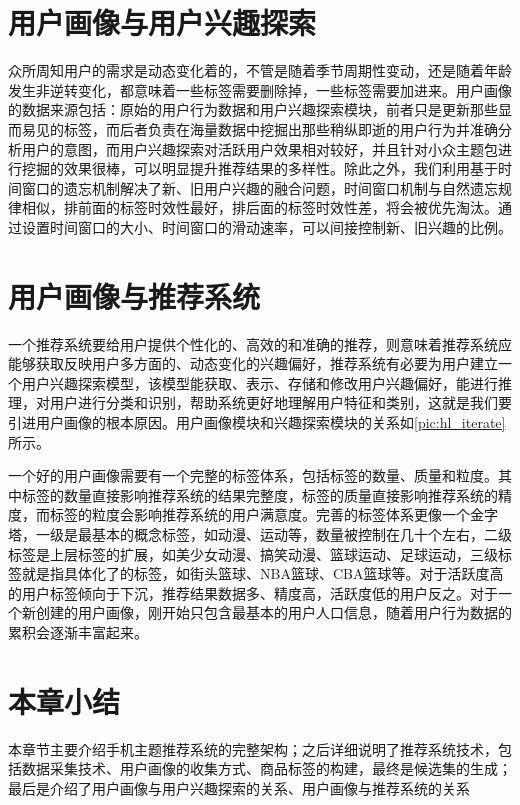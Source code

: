   \section{用户画像与用户兴趣探索}
  众所周知用户的需求是动态变化着的，不管是随着季节周期性变动，还是随着年龄发生非逆转变化，都意味着一些标签需要删除掉，一些标签需要加进来。用户画像的数据来源包括：原始的用户行为数据和用户兴趣探索模块，前者只是更新那些显而易见的标签，而后者负责在海量数据中挖掘出那些稍纵即逝的用户行为并准确分析用户的意图，而用户兴趣探索对活跃用户效果相对较好，并且针对小众主题包进行挖掘的效果很棒，可以明显提升推荐结果的多样性。除此之外，我们利用基于时间窗口的遗忘机制解决了新、旧用户兴趣的融合问题，时间窗口机制与自然遗忘规律相似，排前面的标签时效性最好，排后面的标签时效性差，将会被优先淘汰。通过设置时间窗口的大小、时间窗口的滑动速率，可以间接控制新、旧兴趣的比例。

  \section{用户画像与推荐系统}
  一个推荐系统要给用户提供个性化的、高效的和准确的推荐，则意味着推荐系统应能够获取反映用户多方面的、动态变化的兴趣偏好，推荐系统有必要为用户建立一个用户兴趣探索模型，该模型能获取、表示、存储和修改用户兴趣偏好，能进行推理，对用户进行分类和识别，帮助系统更好地理解用户特征和类别，这就是我们要引进用户画像的根本原因。用户画像模块和兴趣探索模块的关系如\autoref{pic:hl_iterate}所示。
  \begin{figure}
    \centering
      \label{pic:hl_iterate}
  \end{figure}

  一个好的用户画像需要有一个完整的标签体系，包括标签的数量、质量和粒度。其中标签的数量直接影响推荐系统的结果完整度，标签的质量直接影响推荐系统的精度，而标签的粒度会影响推荐系统的用户满意度。完善的标签体系更像一个金字塔，一级是最基本的概念标签，如动漫、运动等，数量被控制在几十个左右，二级标签是上层标签的扩展，如美少女动漫、搞笑动漫、篮球运动、足球运动，三级标签就是指具体化了的标签，如街头篮球、NBA篮球、CBA篮球等。对于活跃度高的用户标签倾向于下沉，推荐结果数据多、精度高，活跃度低的用户反之。对于一个新创建的用户画像，刚开始只包含最基本的用户人口信息，随着用户行为数据的累积会逐渐丰富起来。

  \section{本章小结}
  本章节主要介绍手机主题推荐系统的完整架构；之后详细说明了推荐系统技术，包括数据采集技术、用户画像的收集方式、商品标签的构建，最终是候选集的生成；最后是介绍了用户画像与用户兴趣探索的关系、用户画像与推荐系统的关系